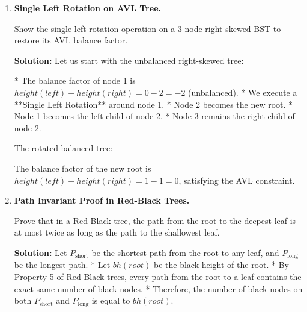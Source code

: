\documentclass[12pt, a4paper]{book}
\begin{document}
\begin{problembox}
\begin{enumerate}[label=\textbf{E\arabic*.}]
  \item \textbf{Single Left Rotation on AVL Tree.}
  
        Show the single left rotation operation on a 3-node right-skewed BST to restore its AVL balance factor.
        
        \textbf{Solution:}
        Let us start with the unbalanced right-skewed tree:
        \begin{center}
        \end{center}
        * The balance factor of node 1 is $height(left) - height(right) = 0 - 2 = -2$ (unbalanced).
        * We execute a **Single Left Rotation** around node 1.
          * Node 2 becomes the new root.
          * Node 1 becomes the left child of node 2.
          * Node 3 remains the right child of node 2.
        
        The rotated balanced tree:
        \begin{center}
        \end{center}
        The balance factor of the new root is $height(left) - height(right) = 1 - 1 = 0$, satisfying the AVL constraint.
        
  \item \textbf{Path Invariant Proof in Red-Black Trees.}
  
        Prove that in a Red-Black tree, the path from the root to the deepest leaf is at most twice as long as the path to the shallowest leaf.
        
        \textbf{Solution:}
        Let $P_{\text{short}}$ be the shortest path from the root to any leaf, and $P_{\text{long}}$ be the longest path.
        * Let $bh(root)$ be the black-height of the root.
        * By Property 5 of Red-Black trees, every path from the root to a leaf contains the exact same number of black nodes.
        * Therefore, the number of black nodes on both $P_{\text{short}}$ and $P_{\text{long}}$ is equal to $bh(root)$.
        

\end{enumerate}
\end{problembox}
\end{document}
